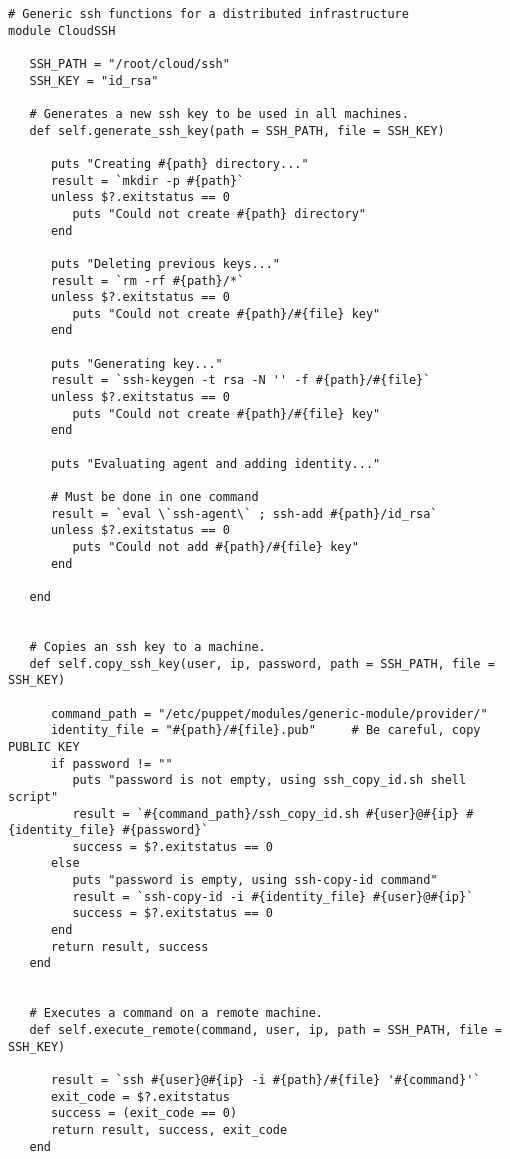 \begin{lstlisting}
# Generic ssh functions for a distributed infrastructure
module CloudSSH
   
   SSH_PATH = "/root/cloud/ssh"
   SSH_KEY = "id_rsa"

   # Generates a new ssh key to be used in all machines.
   def self.generate_ssh_key(path = SSH_PATH, file = SSH_KEY)
      
      puts "Creating #{path} directory..."
      result = `mkdir -p #{path}`
      unless $?.exitstatus == 0
         puts "Could not create #{path} directory"
      end
      
      puts "Deleting previous keys..."
      result = `rm -rf #{path}/*`
      unless $?.exitstatus == 0
         puts "Could not create #{path}/#{file} key"
      end
      
      puts "Generating key..."
      result = `ssh-keygen -t rsa -N '' -f #{path}/#{file}`
      unless $?.exitstatus == 0
         puts "Could not create #{path}/#{file} key"
      end
      
      puts "Evaluating agent and adding identity..."
      
      # Must be done in one command
      result = `eval \`ssh-agent\` ; ssh-add #{path}/id_rsa`
      unless $?.exitstatus == 0
         puts "Could not add #{path}/#{file} key"
      end

   end
   
   
   # Copies an ssh key to a machine.
   def self.copy_ssh_key(user, ip, password, path = SSH_PATH, file = SSH_KEY)
   
      command_path = "/etc/puppet/modules/generic-module/provider/"
      identity_file = "#{path}/#{file}.pub"     # Be careful, copy PUBLIC KEY
      if password != ""
         puts "password is not empty, using ssh_copy_id.sh shell script"
         result = `#{command_path}/ssh_copy_id.sh #{user}@#{ip} #{identity_file} #{password}`
         success = $?.exitstatus == 0
      else
         puts "password is empty, using ssh-copy-id command"
         result = `ssh-copy-id -i #{identity_file} #{user}@#{ip}`
         success = $?.exitstatus == 0
      end
      return result, success
   end
   
   
   # Executes a command on a remote machine.
   def self.execute_remote(command, user, ip, path = SSH_PATH, file = SSH_KEY)
   
      result = `ssh #{user}@#{ip} -i #{path}/#{file} '#{command}'`
      exit_code = $?.exitstatus
      success = (exit_code == 0)
      return result, success, exit_code
   end
   

\end{lstlisting}
